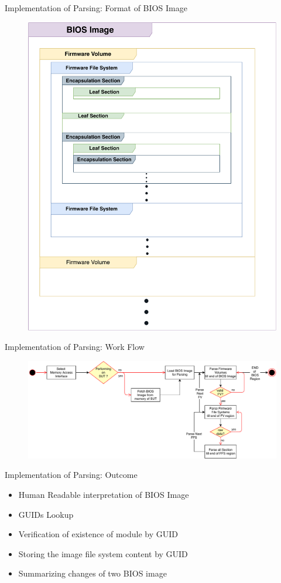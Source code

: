 \begin{frame}{Implementation of Parsing: Format of BIOS Image}
  \begin{figure}[htbp]
    \centering
    \includegraphics[width=0.5\linewidth]{Im/figures/bios-as-filesystem}
  \end{figure}
\end{frame}

\begin{frame}{Implementation of Parsing: Work Flow}
  \begin{figure}[htbp]
    \centering
    \includegraphics[width=\linewidth]{Im/figures/uefi-parser}
  \end{figure}
\end{frame}

\begin{frame}{Implementation of Parsing: Outcome}
  \begin{itemize}
    \item Human Readable interpretation of BIOS Image
    \item GUIDs Lookup
    \item Verification of existence of module by GUID
    \item Storing the image file system content by GUID
    \item Summarizing changes of two BIOS image
  \end{itemize}
\end{frame}

